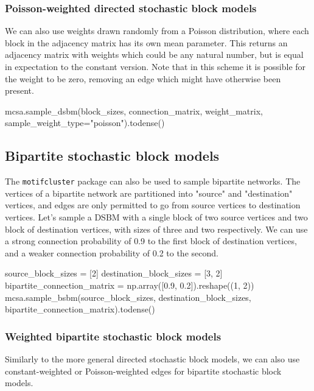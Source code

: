 \documentclass{article}
\begin{document}
\subsubsection{Poisson-weighted directed stochastic block models}

We can also use weights drawn randomly from a Poisson distribution,
where each block in the adjacency matrix has its own mean parameter.
This returns an adjacency matrix with weights which could be any natural
number, but is equal in expectation to the constant version.
Note that in this scheme it is possible for the weight to be zero,
removing an edge which might have otherwise been present.

\begin{pyconsole}
mcsa.sample_dsbm(block_sizes, connection_matrix, weight_matrix,
  sample_weight_type="poisson").todense()
\end{pyconsole}

\subsection{Bipartite stochastic block models}

The \texttt{motifcluster} package can also be used to sample
bipartite networks.
The vertices of a bipartite network are partitioned
into "source" and "destination" vertices,
and edges are only permitted to go from source vertices
to destination vertices.
Let's sample a DSBM with a single block of two source vertices
and two block of destination vertices, with
sizes of three and two respectively.
We can use a strong connection probability of 0.9 to the first block of
destination vertices,
and a weaker connection probability of 0.2 to the second.

\begin{pyconsole}
source_block_sizes = [2]
destination_block_sizes = [3, 2]
bipartite_connection_matrix = np.array([0.9, 0.2]).reshape((1, 2))
mcsa.sample_bsbm(source_block_sizes, destination_block_sizes,
  bipartite_connection_matrix).todense()
\end{pyconsole}

\subsubsection{Weighted bipartite stochastic block models}

Similarly to the more general directed stochastic block models,
we can also use constant-weighted or Poisson-weighted edges for bipartite
stochastic block models.
\end{document}
